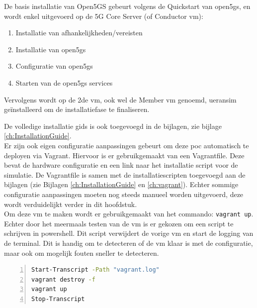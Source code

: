 De basis installatie van Open5GS gebeurt volgens de Quickstart van \gls{open5gs}, \textcite{Lee2025a} en wordt enkel uitgevoerd op de 5G Core Server (of Conductor \gls{vm}):

\begin{enumerate}
    \item Installatie van afhankelijkheden/vereisten
    \item Installatie van \gls{open5gs}
    \item Configuratie van \gls{open5gs}
    \item Starten van de \gls{open5gs} services
\end{enumerate}

Vervolgens wordt op de 2de \gls{vm}, ook wel de Member \gls{vm} genoemd, \gls{ueransim} geïnstalleerd om de installatiefase te finaliseren. 

De volledige installatie gids is ook toegevoegd in de bijlagen, zie bijlage \ref{ch:InstallationGuide}.\\

Er zijn ook eigen configuratie aanpassingen gebeurt om deze \gls{poc} automatisch te deployen via Vagrant. Hiervoor is er gebruikgemaakt van een Vagrantfile. Deze bevat de hardware configuratie en een link naar het installatie script voor de simulatie. De Vagrantfile is samen met de installatiescripten toegevoegd aan de bijlagen (zie Bijlagen \ref{ch:InstallationGuide} en \ref{ch:vagrant}). Echter sommige configuratie aanpassingen moeten nog steeds manueel worden uitgevoerd, deze wordt verduidelijkt verder in dit hoofdstuk.\\
Om deze \gls{vm} te maken wordt er gebruikgemaakt van het commando: \lstinline!vagrant up!. Echter door het meermaals testen van de \gls{vm} is er gekozen om een script te schrijven in powershell. Dit script verwijdert de vorige \gls{vm} en start de logging van de terminal. Dit is handig om te detecteren of de \gls{vm} klaar is met de configuratie, maar ook om mogelijk fouten sneller te detecteren.

\begin{lstlisting}[basicstyle=\small, frame=single, breaklines=true, postbreak=\mbox{\textcolor{red}{$\hookrightarrow$}\space}, escapeinside ={\%,}, escapechar={!}, numbers=left, language=sh, caption=Build Script]
Start-Transcript -Path "vagrant.log"
vagrant destroy -f
vagrant up
Stop-Transcript
\end{lstlisting}

\section{}%
\label{sec:Config}%

